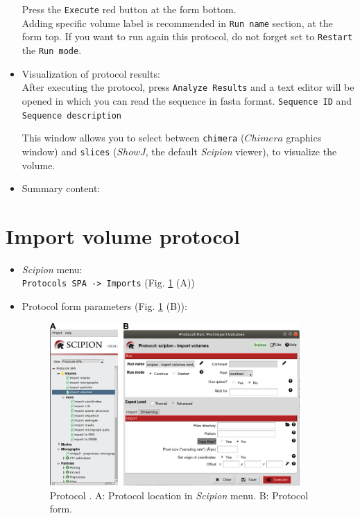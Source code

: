 \documentclass[12pt, draft]{article} %
\def\scipion{\textit{Scipion}\xspace}
\newcommand{\ffigure}[1]{{Fig. {\ref{#1}}}\xspace}
\newcommand{\scommand}[1]{{{\keys{#1}}}\xspace}
\newcommand{\ttt}[1]{\texttt{#1}}
\begin{document}
\begin{appendices}
\begin{itemize}
  Press the \ttt{Execute} red button at the form bottom.\\
  Adding specific volume label is recommended in \ttt{Run name} section, at the form top. If you want to run again this protocol, do not forget set to \ttt{Restart} the \ttt{Run mode}.\\
  
  \item Visualization of protocol results:\\
  
  After executing the protocol, press \ttt{Analyze Results} and a text editor will be opened in which you can read the sequence in fasta format. \ttt{Sequence ID} and \ttt{Sequence description}
  
  
  
  This window allows you to select between \ttt{chimera} ($Chimera$ graphics window) and \ttt{slices} ($ShowJ$, the default \scipion viewer), to visualize the volume.
  
 \item Summary content:\\
   
   
  
  \end{itemize}

\section{Import volume protocol}
\label{app:importVolume}
   
 \begin{itemize}
  \item \scipion menu:\\
  \ttt{Protocols SPA -> Imports} (\ffigure{fig:app_protocol_volume_1} (A))\\
  
  \item Protocol form parameters (\ffigure{fig:app_protocol_volume_1} (B)):\\
  
  \begin{figure}[H]
    \centering 
    \captionsetup{width=.7\linewidth} 
    \includegraphics[width=0.90\textwidth]{Images_appendix/Fig100.png}
    \caption{Protocol \scommand{import volumes}. A: Protocol location in \scipion menu. B: Protocol form.}
    \label{fig:app_protocol_volume_1}
   \end{figure}
  

\end{itemize}
\end{appendices}
\end{document}
